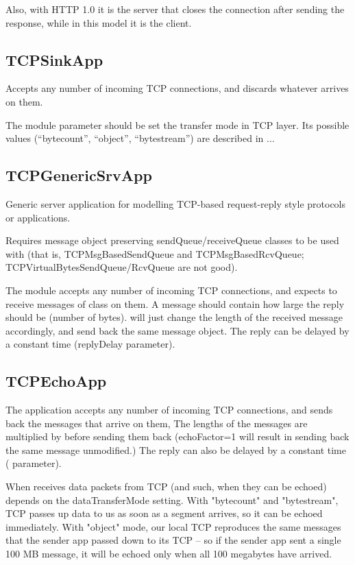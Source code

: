 Also, with HTTP 1.0 it is the server that closes the connection after
sending the response, while in this model it is the client.

\subsection{TCPSinkApp}

Accepts any number of incoming TCP connections, and discards whatever
arrives on them.

The module parameter  should be set the transfer mode in TCP layer.
Its possible values (``bytecount'', ``object'', ``bytestream'') are described in ...

\subsection{TCPGenericSrvApp}

Generic server application for modelling TCP-based request-reply style
protocols or applications.

Requires message object preserving sendQueue/receiveQueue classes
to be used with  (that is, TCPMsgBasedSendQueue and TCPMsgBasedRcvQueue;
TCPVirtualBytesSendQueue/RcvQueue are not good).

The module accepts any number of incoming TCP connections, and expects
to receive messages of class  on them. A message should
contain how large the reply should be (number of bytes). 
will just change the length of the received message accordingly, and send
back the same message object. The reply can be delayed by a constant time
(replyDelay parameter).

\subsection{TCPEchoApp}

The  application accepts any number of incoming TCP
connections, and sends back the messages that arrive on them, The lengths of the
messages are multiplied by  before sending them back (echoFactor=1
will result in sending back the same message unmodified.) The reply can also be
delayed by a constant time ( parameter).

When  receives data packets from TCP (and such, when they can be
echoed) depends on the dataTransferMode setting.
With "bytecount" and "bytestream", TCP passes up data to us
as soon as a segment arrives, so it can be echoed immediately.
With "object" mode, our local TCP reproduces the same
messages that the sender app passed down to its TCP -- so if the sender
app sent a single 100 MB message, it will be echoed only when all
100 megabytes have arrived.

